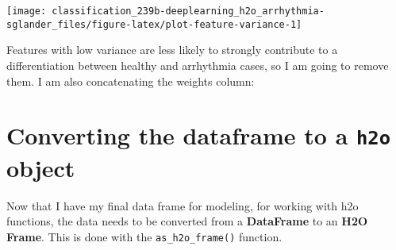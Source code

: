 \documentclass[]{book}
\newenvironment{Shaded}{\begin{snugshade}}{\end{snugshade}}
\newcommand{\CommentTok}[1]{\textcolor[rgb]{0.56,0.35,0.01}{\textit{#1}}}
\newcommand{\DataTypeTok}[1]{\textcolor[rgb]{0.13,0.29,0.53}{#1}}
\newcommand{\DecValTok}[1]{\textcolor[rgb]{0.00,0.00,0.81}{#1}}
\newcommand{\ErrorTok}[1]{\textcolor[rgb]{0.64,0.00,0.00}{\textbf{#1}}}
\newcommand{\KeywordTok}[1]{\textcolor[rgb]{0.13,0.29,0.53}{\textbf{#1}}}
\newcommand{\NormalTok}[1]{#1}
\newcommand{\OperatorTok}[1]{\textcolor[rgb]{0.81,0.36,0.00}{\textbf{#1}}}
\newcommand{\StringTok}[1]{\textcolor[rgb]{0.31,0.60,0.02}{#1}}
\begin{document}
\begin{center}\texttt{[image: classification\_239b-deeplearning\_h2o\_arrhythmia-sglander\_files/figure-latex/plot-feature-variance-1]} \end{center}

Features with low variance are less likely to strongly contribute to a differentiation between healthy and arrhythmia cases, so I am going to remove them. I am also concatenating the weights column:

\begin{Shaded}
\end{Shaded}

\hypertarget{converting-the-dataframe-to-a-h2o-object}{%
\section{\texorpdfstring{Converting the dataframe to a \texttt{h2o} object}{Converting the dataframe to a h2o object}}\label{converting-the-dataframe-to-a-h2o-object}}

Now that I have my final data frame for modeling, for working with h2o functions, the data needs to be converted from a \textbf{DataFrame} to an \textbf{H2O Frame}. This is done with the \texttt{as\_h2o\_frame()} function.

\begin{Shaded}
\end{Shaded}
\end{document}
